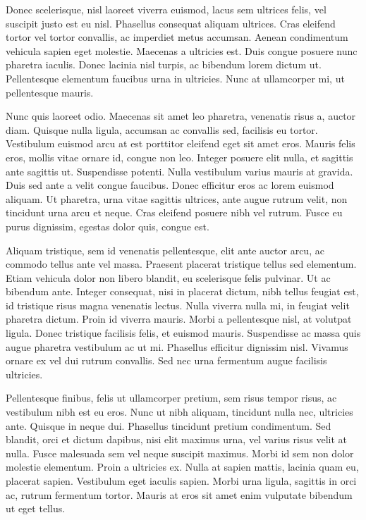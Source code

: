 \documentclass{article}
\begin{document}
Donec scelerisque, nisl laoreet viverra euismod, lacus sem ultrices
felis, vel suscipit justo est eu nisl. Phasellus consequat aliquam
ultrices. Cras eleifend tortor vel tortor convallis, ac imperdiet metus
accumsan. Aenean condimentum vehicula sapien eget molestie. Maecenas a
ultricies est. Duis congue posuere nunc pharetra iaculis. Donec lacinia
nisl turpis, ac bibendum lorem dictum ut. Pellentesque elementum
faucibus urna in ultricies. Nunc at ullamcorper mi, ut pellentesque
mauris.

Nunc quis laoreet odio. Maecenas sit amet leo pharetra, venenatis risus
a, auctor diam. Quisque nulla ligula, accumsan ac convallis sed,
facilisis eu tortor. Vestibulum euismod arcu at est porttitor eleifend
eget sit amet eros. Mauris felis eros, mollis vitae ornare id, congue
non leo. Integer posuere elit nulla, et sagittis ante sagittis ut.
Suspendisse potenti. Nulla vestibulum varius mauris at gravida. Duis sed
ante a velit congue faucibus. Donec efficitur eros ac lorem euismod
aliquam. Ut pharetra, urna vitae sagittis ultrices, ante augue rutrum
velit, non tincidunt urna arcu et neque. Cras eleifend posuere nibh vel
rutrum. Fusce eu purus dignissim, egestas dolor quis, congue est.

Aliquam tristique, sem id venenatis pellentesque, elit ante auctor arcu,
ac commodo tellus ante vel massa. Praesent placerat tristique tellus sed
elementum. Etiam vehicula dolor non libero blandit, eu scelerisque felis
pulvinar. Ut ac bibendum ante. Integer consequat, nisi in placerat
dictum, nibh tellus feugiat est, id tristique risus magna venenatis
lectus. Nulla viverra nulla mi, in feugiat velit pharetra dictum. Proin
id viverra mauris. Morbi a pellentesque nisl, at volutpat ligula. Donec
tristique facilisis felis, et euismod mauris. Suspendisse ac massa quis
augue pharetra vestibulum ac ut mi. Phasellus efficitur dignissim nisl.
Vivamus ornare ex vel dui rutrum convallis. Sed nec urna fermentum augue
facilisis ultricies.

Pellentesque finibus, felis ut ullamcorper pretium, sem risus tempor
risus, ac vestibulum nibh est eu eros. Nunc ut nibh aliquam, tincidunt
nulla nec, ultricies ante. Quisque in neque dui. Phasellus tincidunt
pretium condimentum. Sed blandit, orci et dictum dapibus, nisi elit
maximus urna, vel varius risus velit at nulla. Fusce malesuada sem vel
neque suscipit maximus. Morbi id sem non dolor molestie elementum. Proin
a ultricies ex. Nulla at sapien mattis, lacinia quam eu, placerat
sapien. Vestibulum eget iaculis sapien. Morbi urna ligula, sagittis in
orci ac, rutrum fermentum tortor. Mauris at eros sit amet enim vulputate
bibendum ut eget tellus.
\end{document}
